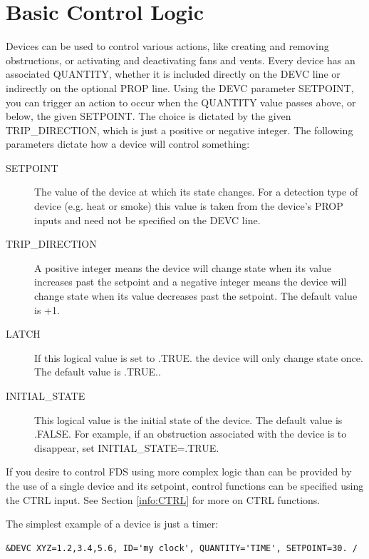 \documentclass[11pt]{book}
\begin{document}
\clearpage

\section{Basic Control Logic}
\label{info:basic_control}

Devices can be used to control various actions, like creating and removing obstructions, or activating and deactivating
fans and vents. Every device has an associated {\ct QUANTITY}, whether it is included directly on the {\ct DEVC} line or
indirectly on the optional {\ct PROP} line. Using the {\ct DEVC} parameter {\ct SETPOINT}, you can trigger an action to
occur when the {\ct QUANTITY} value passes above, or below, the given {\ct SETPOINT}. The choice is dictated by the
given {\ct TRIP\_DIRECTION}, which is just a positive or negative integer.
The following parameters dictate how a device will control something:
\begin{description}
\item[{\ct SETPOINT}] The value of the device at which its state changes.  For a detection type of device
(e.g. heat or smoke) this value is taken from the device's {\ct PROP} inputs and need not be specified on the {\ct DEVC} line.
\item[{\ct TRIP\_DIRECTION}] A positive integer means the device will change state when its value increases
past the setpoint and a negative integer means the device will change state
when its value decreases past the setpoint.  The default value is +1.
\item[{\ct LATCH}] If this logical value is set to {\ct .TRUE.} the device will only change state once.
The default value is {\ct .TRUE.}.
\item[{\ct INITIAL\_STATE}] This logical value is the initial state of the device. The default value
is {\ct .FALSE.} For example, if an obstruction associated with the device is to disappear, set {\ct INITIAL\_STATE=.TRUE.}
\end{description}
If you desire to control FDS using more complex logic than can be provided
by the use of a single device and its setpoint, control functions can be specified using the {\ct CTRL} input.
See Section \ref{info:CTRL} for more on {\ct CTRL} functions.

The simplest example of a device is just a timer:

\footnotesize
\begin{verbatim}
&DEVC XYZ=1.2,3.4,5.6, ID='my clock', QUANTITY='TIME', SETPOINT=30. /
\end{verbatim}
\normalsize
\end{document}
